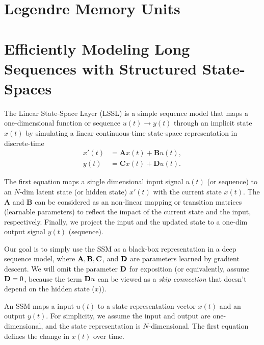 \section{Legendre Memory Units}
\label{sec:nlp_lmu}


\section{Efficiently Modeling Long Sequences with Structured State-Spaces}
\label{sec:nlp_ssm}
The Linear State-Space Layer (LSSL) is a simple sequence model that maps a one-dimensional function  or sequence $u(t)\to y(t)$ through an implicit state $x(t)$ by simulating a linear continuous-time state-space representation in discrete-time
\begin{align*}
	x'(t) &= \mathbf{A}x(t)+\mathbf{B}u(t),\\
	y(t) &= \mathbf{C}x(t)+\mathbf{D}u(t).
\end{align*}

The first equation maps a single dimensional input signal $u(t)$ (or sequence) to an $N$-dim latent state (or hidden state) $x'(t)$ with the current state $x(t)$. The $\mathbf{A}$ and $\mathbf{B}$ can be considered as an non-linear mapping or transition matrices (\ie learnable parameters) to reflect the impact of the current state and the input, respectively. Finally, we project the input and the updated state to a one-dim output signal $y(t)$ (\ie sequence).  

Our goal is to simply use the SSM as a black-box representation in a deep sequence model, where ${\mathbf{A}}, {\mathbf{B}}, {\mathbf{C}}$, and ${\mathbf{D}}$ are parameters learned by gradient descent. We will omit the parameter ${\mathbf{D}}$ for exposition (or equivalently, assume ${\mathbf{D}}=0$, because the term ${\mathbf{D}} u$ can be viewed as a \textit{skip connection} that doesn't depend on the hidden state ($x$)).

An SSM maps a input $u(t)$ to a state representation vector $x(t)$ and an output $y(t)$. For simplicity, we assume the input and output are one-dimensional, and the state representation is $N$-dimensional. The first equation defines the change in $x(t)$ over time.

